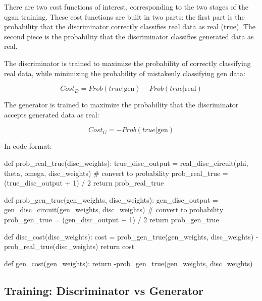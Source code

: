 There are two cost functions of interest, corresponding to the two stages of 
the \gls{qgan} training. These cost functions are built in two parts: the 
first part is the probability that the discriminator correctly classifies real 
data as real (true). The second piece is the probability that the discriminator 
classifies generated data as real.

The discriminator is trained to maximize the probability of correctly classifying 
real data, while minimizing the probability of mistakenly classifying gen data:

\begin{linenomath}
\begin{equation}
Cost_D=Prob(true|\mathrm{gen})-Prob(true|\mathrm{real})
\label{eq:costd}
\end{equation}
\end{linenomath}

The generator is trained to maximize the probability that the discriminator 
accepts generated data as real:

\begin{linenomath}
\begin{equation}
Cost_G=-Prob(true|\mathrm{gen})
\label{eq:costg}
\end{equation}
\end{linenomath}

In code format:
\begin{python}
def prob_real_true(disc_weights):
    true_disc_output = real_disc_circuit(phi, theta, omega, disc_weights)
    # convert to probability
    prob_real_true = (true_disc_output + 1) / 2
    return prob_real_true

def prob_gen_true(gen_weights, disc_weights):
    gen_disc_output = gen_disc_circuit(gen_weights, disc_weights)
    # convert to probability
    prob_gen_true = (gen_disc_output + 1) / 2
    return prob_gen_true

def disc_cost(disc_weights):
    cost = prob_gen_true(gen_weights, disc_weights) - 
        prob_real_true(disc_weights)
    return cost

def gen_cost(gen_weights):
    return -prob_gen_true(gen_weights, disc_weights)
\end{python}

\subsection{Training: Discriminator vs Generator}
\label{sec:vs}

